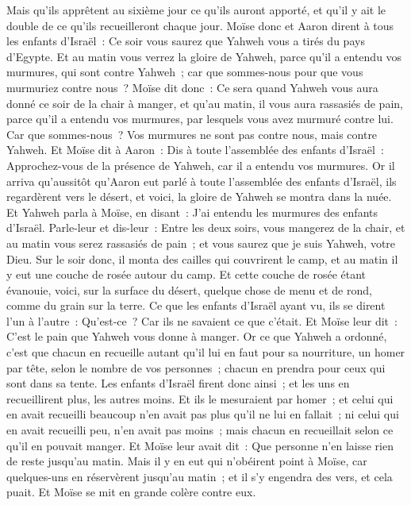 \begin{multicols}{2}
Mais qu'ils apprêtent au sixième jour ce qu'ils auront apporté, et qu'il y ait le double de ce qu'ils recueilleront chaque jour.
Moïse donc et Aaron dirent à tous les enfants d'Israël~: Ce soir vous saurez que Yahweh vous a tirés du pays d'Egypte.
Et au matin vous verrez la gloire de Yahweh, parce qu'il a entendu vos murmures, qui sont contre Yahweh~; car que sommes-nous pour que vous murmuriez contre nous~?
Moïse dit donc~: Ce sera quand Yahweh vous aura donné ce soir de la chair à manger, et qu'au matin, il vous aura rassasiés de pain, parce qu'il a entendu vos murmures, par lesquels vous avez murmuré contre lui. Car que sommes-nous~? Vos murmures ne sont pas contre nous, mais contre Yahweh.
Et Moïse dit à Aaron~: Dis à toute l'assemblée des enfants d'Israël~: Approchez-vous de la présence de Yahweh, car il a entendu vos murmures.
Or il arriva qu'aussitôt qu'Aaron eut parlé à toute l'assemblée des enfants d'Israël, ils regardèrent vers le désert, et voici, la gloire de Yahweh se montra dans la nuée.
 Et Yahweh parla à Moïse, en disant~:
J'ai entendu les murmures des enfants d'Israël. Parle-leur et dis-leur~: Entre les deux soirs, vous mangerez de la chair, et au matin vous serez rassasiés de pain~; et vous saurez que je suis Yahweh, votre Dieu.
Sur le soir donc, il monta des cailles qui couvrirent le camp, et au matin il y eut une couche de rosée autour du camp.
Et cette couche de rosée étant évanouie, voici, sur la surface du désert, quelque chose de menu et de rond, comme du grain sur la terre.
Ce que les enfants d'Israël ayant vu, ils se dirent l'un à l'autre~: Qu'est-ce~? Car ils ne savaient ce que c'était. Et Moïse leur dit~: C'est le pain que Yahweh vous donne à manger.
Or ce que Yahweh a ordonné, c'est que chacun en recueille autant qu'il lui en faut pour sa nourriture, un homer par tête, selon le nombre de vos personnes~; chacun en prendra pour ceux qui sont dans sa tente.
Les enfants d'Israël firent donc ainsi~; et les uns en recueillirent plus, les autres moins.
Et ils le mesuraient par homer~; et celui qui en avait recueilli beaucoup n'en avait pas plus qu'il ne lui en fallait~; ni celui qui en avait recueilli peu, n'en avait pas moins~; mais chacun en recueillait selon ce qu'il en pouvait manger.
Et Moïse leur avait dit~: Que personne n'en laisse rien de reste jusqu'au matin.
Mais il y en eut qui n'obéirent point à Moïse, car quelques-uns en réservèrent jusqu'au matin~; et il s'y engendra des vers, et cela puait. Et Moïse se mit en grande colère contre eux.

\end{multicols}
